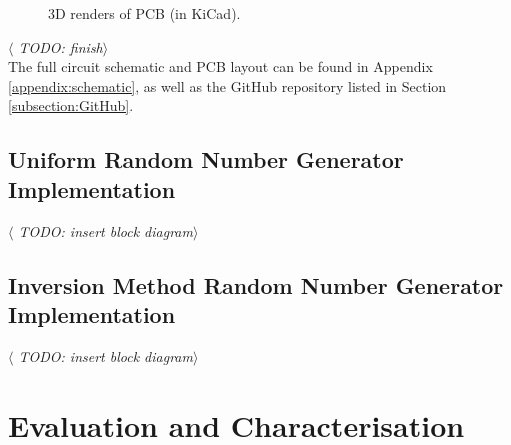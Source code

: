 \documentclass[12pt]{article}
\begin{document}
    \begin{figure}[H]
      \centering
      \caption{3D renders of PCB (in KiCad).}
      \label{fig:pcb_render}
    \end{figure}

    \textit{$\langle$ TODO: finish$\rangle$}
    \\
    The full circuit schematic and PCB layout can be found in Appendix \ref{appendix:schematic}, as well as the GitHub repository listed in Section \ref{subsection:GitHub}.

    \subsection{Uniform Random Number Generator Implementation}
    \textit{$\langle$ TODO: insert block diagram$\rangle$}

    \subsection{Inversion Method Random Number Generator Implementation}
      \textit{$\langle$ TODO: insert block diagram$\rangle$}

\newpage



%
%

\section{Evaluation and Characterisation} \label{characterisation_section}
\end{document}
